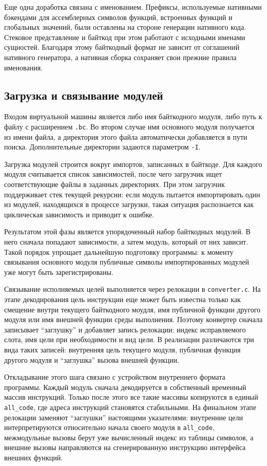 Еще одна доработка связана с именованием. Префиксы, используемые нативными
бэкендами для ассемблерных символов функций, встроенных функций и глобальных
значений, были оставлены на стороне генерации нативного кода.
Стековое представление и байткод при этом работают с исходными именами
сущностей. Благодаря этому байткодный формат не зависит от соглашений
нативного генератора, а нативная сборка сохраняет свои прежние правила
именования. 

\subsection{Загрузка и связывание модулей}
Входом виртуальной машины является либо имя байткодного модуля, либо путь к
файлу с расширением \verb=.bc=. Во втором случае имя основного модуля
получается из имени файла, а директория этого файла автоматически добавляется в
пути поиска. Дополнительные директории задаются параметром \verb=-I=.

Загрузка модулей строится вокруг импортов, записанных в байткоде. Для каждого
модуля считывается список зависимостей, после чего загрузчик ищет
соответствующие файлы в заданных директориях. При этом загрузчик поддерживает стек текущей рекурсии: если модуль
пытается импортировать один из модулей, находящихся в процессе загрузки, такая
ситуация распознается как циклическая зависимость и приводит к
ошибке.

Результатом этой фазы является упорядоченный набор байткодных модулей. В него
сначала попадают зависимости, а затем модуль, который от них зависит. Такой
порядок упрощает дальнейшую подготовку программы: к моменту связывания
основного модуля публичные символы импортированных модулей уже могут быть
зарегистрированы. 

Связывание исполняемых целей выполняется через релокации в \verb=converter.c=.
На этапе декодирования цель инструкции еще может быть известна только как
смещение внутри текущего байткодного моудля, имя публичной функции другого
модуля или имя внешней функции среды выполнения. Поэтому конвертер сначала
записывает \enquote{заглушку} и добавляет запись релокации: индекс исправляемого
слота, имя цели при необходимости и вид цели. В реализации различаются три
вида таких записей: внутренняя цель текущего модуля, публичная функция другого
модуля и \enquote{заглушка} вызова внешней функции.

Откладывание этого шага связано с устройством внутреннего формата программы.
Каждый модуль сначала декодируется в собственный временный массив инструкций.
Только после этого все такие массивы копируются в единый \verb=all_code=, где
адреса инструкций становятся стабильными. На финальном этапе релокации
заменяют \enquote{заглушки} настоящими указателями: внутренние цели
интерпретируются относительно начала своего модуля в \verb=all_code=,
межмодульные вызовы берут уже вычисленный индекс из таблицы символов, а
внешние вызовы направляются на сгенерированную инструкцию интерфейса
внешних функций.

